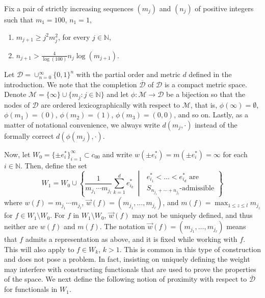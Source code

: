 \documentclass[12pt,a4paper]{amsart}
\newcommand{\N}{\mathbb{N}}
\newcommand{\bes}{\begin{equation*}}
\newcommand{\ees}{\end{equation*}}
\theoremstyle{definition}
\theoremstyle{plain}
\begin{document}
Fix a pair of strictly increasing sequences $(m_{j})$ and $(n_{j})$ of positive integers such that $m_{1}=100$, $n_{1}=1$,
\begin{enumerate}[label=(\arabic*)]
\item\label{condition m_j} $m_{j+1}\geq j^2m_j^2$, for every $j\in\N$,
\item\label{condition n_j} $n_{j+1}>\frac{4}{\log(100)}n_{j}\log(m_{j+1})$.
\end{enumerate}



Let $\mathcal{D} = \cup_{n=0}^\infty\{0,1\}^n$ with the partial order and metric $d$ defined in the introduction. We note that the completion $\overline{\mathcal{D}}$ of $\mathcal{D}$ is a compact metric space. Denote $\mathcal{M} = \{\infty\}\cup\{m_j:j\in\N\}$ and let $\phi:\mathcal{M}\to\mathcal{D}$ be a bijection so that the nodes of $\mathcal{D}$ are ordered lexicographically with respect to $\mathcal{M}$, that is, $\phi(\infty) = \emptyset$, $\phi(m_{1}) = (0)$, $\phi(m_{2})=(1)$, $\phi(m_{3}) = (0,0)$, and so on. Lastly, as a matter of notational convenience, we always write $d(m_{j},\cdot)$ instead of the formally correct $d(\phi(m_{j}),\cdot)$.



Now, let $W_{0}=\{\pm e_{i}^{*}\}_{i=1}^{\infty}\subset c_{00}$ and write $w(\pm e^{*}_{i})=m(\pm e^{*}_{i})=\infty$ for each $i\in\N$. Then, define the set
\bes W_{1}=W_{0}\cup\left\{\frac{1}{m_{j_{1}}\cdots m_{j_{l}}}\sum_{k=1}^{d}e^{*}_{i_{k}} \;\middle\vert\; \substack{ e^{*}_{i_{1}}<\ldots<e^{*}_{i_{d}} \text{ are } \\ S_{n_{j_{1}}+\cdots+n_{j_{l}}}\text{-admissible}} \right\} \ees
where $w(f)=m_{j_{1}}\cdots m_{j_{l}}$, $\vec w(f) = (m_{j_1},\ldots,m_{j_\ell})$, and $m(f)=\max_{1\leq z\leq l}m_{j_{z}}$ for $f\in W_{1}\setminus W_{0}$. { For $f$ in $W_1\setminus W_0$, $\vec w(f)$ may not be uniquely defined, and thus neither are $w(f)$ and $m(f)$. The notation $\vec w(f) = (m_{j_1},\ldots,m_{j_\ell})$ means that $f$ admits a representation as above, and it is fixed while working with $f$. This will also apply to $f\in W_k$, $k>1$. This is common in this type of construction and does not pose a problem. In fact, insisting on uniquely defining the weight may interfere with constructing functionals that are used to prove the properties of the space.} We next define the following notion of proximity with respect to $\overline{\mathcal{D}}$ for functionals in $W_{1}$.
\end{document}
